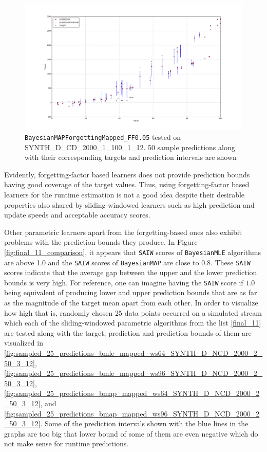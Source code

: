 \begin{figure}[htbp]
  \centering
    \includegraphics[width=\linewidth]{./Figures/sampled_50_predictions_bmap_mapped_fr5_SYNTH_D_CD_2000_1_100_1_12.pdf}
  \caption{\texttt{BayesianMAPForgettingMapped\_FF0.05} tested on SYNTH\_D\_CD\_2000\_1\_100\_1\_12. 50 sample predictions along with their corresponding targets and prediction intervals are shown}
 \label{fig:sampled_50_predictions_bmap_mapped_fr5_SYNTH_D_CD_2000_1_100_1_12}
\end{figure}

Evidently, forgetting-factor based learners does not provide prediction bounds having good coverage of the target values. Thus, using forgetting-factor based learners for the runtime estimation is not a good idea despite their desirable properties also shared by sliding-windowed learners such as high prediction and update speeds and acceptable accuracy scores.

Other parametric learners apart from the forgetting-based ones also exhibit problems with the prediction bounds they produce. In Figure \ref{fig:final_11_comparison}, it appears that \texttt{SAIW} scores of \texttt{BayesianMLE} algorithms are above 1.0 and the \texttt{SAIW} scores of \texttt{BayesianMAP} are close to $0.8$. These \texttt{SAIW} scores indicate that the average gap between the upper and the lower prediction bounds is very high. For reference, one can imagine having the \texttt{SAIW} score if $1.0$ being equivalent of producing lower and upper prediction bounds that are as far as the magnitude of the target mean apart from each other. In order to visualize how high that is, randomly chosen $25$ data points occurred on a simulated stream which each of the sliding-windowed parametric algorithms from the list \ref{final_11} are tested along with the target, prediction and prediction bounds of them are visualized in \ref{fig:sampled_25_predictions_bmle_mapped_ws64_SYNTH_D_NCD_2000_2_50_3_12},
\ref{fig:sampled_25_predictions_bmle_mapped_ws96_SYNTH_D_NCD_2000_2_50_3_12},
\ref{fig:sampled_25_predictions_bmap_mapped_ws64_SYNTH_D_NCD_2000_2_50_3_12},
and \ref{fig:sampled_25_predictions_bmap_mapped_ws96_SYNTH_D_NCD_2000_2_50_3_12}.
Some of the prediction intervals shown with the blue lines in the graphs are too big that lower bound of some of them are even negative which do not make sense for runtime predictions.


